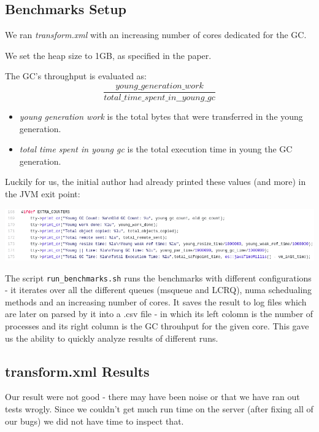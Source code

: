 \documentclass{article}
\begin{document}
 \subsection{Benchmarks Setup}
 We ran \textit{transform.xml} with an increasing number of cores dedicated for the GC.

 We set the heap size to 1GB, as specified in the paper.

 The GC's throughput is evaluated as:
 \begin{equation}
	 \frac{young\_generation\_work}{total\_time\_spent\_in\_\_young\_gc}
 \end{equation}

 \begin{itemize}
   \item \textit{young generation work} is the total bytes that were transferred in the young generation.
   \item \textit{total time spent in young gc} is the total execution time in young the GC generation.
 \end{itemize}

 Luckily for us, the initial author had already printed these values (and more) in the JVM exit point:

 \includegraphics[width=\textwidth]{gc-debug-prints.png}

 The script \texttt{run\_benchmarks.sh} runs the benchmarks with different configurations - it iterates over all the different queues (msqueue and LCRQ), numa schedualing methods and an increasing number of cores. It saves the result to log files which are later on parsed by it into a .csv file - in which its left colomn is the number of processes and its right column is the GC throuhput for the given core.
This gave us the ability to quickly analyze results of different runs.

 \newpage

 \subsection{transform.xml Results}
 Our result were not good - there may have been noise or that we have ran out tests wrogly. Since we couldn't get much run time on the server (after fixing all of our bugs) we did not have time to inspect that.
\end{document}
